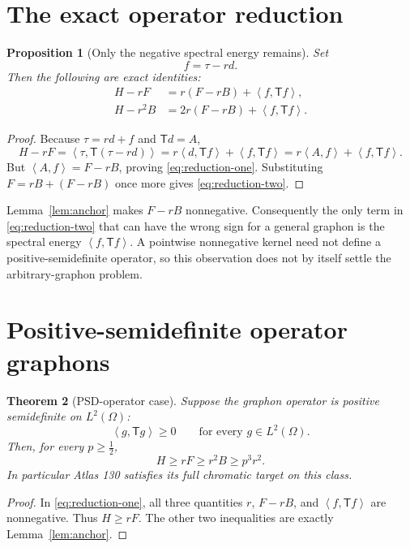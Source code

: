 \documentclass[11pt]{article}
\newtheorem{theorem}{Theorem}[section]
\newtheorem{proposition}[theorem]{Proposition}
\newcommand{\ip}[2]{\left\langle #1,#2\right\rangle}
\newcommand{\TT}{\mathsf T}
\begin{document}
\section{The exact operator reduction}

\begin{proposition}[Only the negative spectral energy remains]
\label{prop:reduction}
Set
\[
 f=\tau-rd.
\]
Then the following are exact identities:
\begin{align}
 H-rF
 &=r(F-rB)+\ip f{\TT f},
 \label{eq:reduction-one}\\
 H-r^2B
 &=2r(F-rB)+\ip f{\TT f}.
 \label{eq:reduction-two}
\end{align}
\end{proposition}

\begin{proof}
Because $\tau=rd+f$ and $\TT d=A$,
\[
 H-rF=\ip\tau{\TT(\tau-rd)}
 =r\ip d{\TT f}+\ip f{\TT f}
 =r\ip A f+\ip f{\TT f}.
\]
But $\ip Af=F-rB$, proving \eqref{eq:reduction-one}.  Substituting
$F=rB+(F-rB)$ once more gives \eqref{eq:reduction-two}.
\end{proof}

Lemma~\ref{lem:anchor} makes $F-rB$ nonnegative.  Consequently the only
term in \eqref{eq:reduction-two} that can have the wrong sign for a general
graphon is the spectral energy $\ip f{\TT f}$.  A pointwise nonnegative
kernel need not define a positive-semidefinite operator, so this observation
does not by itself settle the arbitrary-graphon problem.


\section{Positive-semidefinite operator graphons}

\begin{theorem}[PSD-operator case]
\label{thm:psd}
Suppose the graphon operator is positive semidefinite on $L^2(\Omega)$:
\[
 \ip g{\TT g}\geq0\qquad\text{for every }g\in L^2(\Omega).
\]
Then, for every $p\geq\tfrac12$,
\[
 H\geq rF\geq r^2B\geq p^3r^2.
\]
In particular Atlas 130 satisfies its full chromatic target on this class.
\end{theorem}

\begin{proof}
In \eqref{eq:reduction-one}, all three quantities $r$, $F-rB$, and
$\ip f{\TT f}$ are nonnegative.  Thus $H\geq rF$.  The other two
inequalities are exactly Lemma~\ref{lem:anchor}.
\end{proof}
\end{document}
